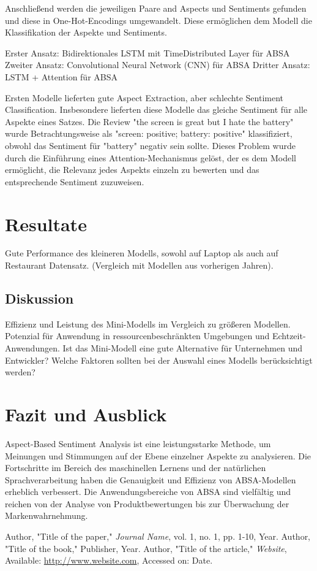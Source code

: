 \documentclass[12pt]{article}
\begin{document}
Anschließend werden die jeweiligen Paare and Aspects und Sentiments gefunden und diese in One-Hot-Encodings umgewandelt. Diese ermöglichen dem Modell die Klassifikation der Aspekte und Sentiments.


Erster Ansatz: Bidirektionales LSTM mit TimeDistributed Layer für ABSA
Zweiter Ansatz: Convolutional Neural Network (CNN) für ABSA
Dritter Ansatz: LSTM + Attention für ABSA

Ersten Modelle lieferten gute Aspect Extraction, aber schlechte Sentiment Classification. Insbesondere lieferten diese Modelle das gleiche Sentiment 
für alle Aspekte eines Satzes. Die Review "the screen is great but I hate the battery" wurde Betrachtungsweise als "screen: positive; battery: positive" 
klassifiziert, obwohl das Sentiment für "battery" negativ sein sollte. Dieses Problem wurde durch die Einführung eines Attention-Mechanismus gelöst, 
der es dem Modell ermöglicht, die Relevanz jedes Aspekts einzeln zu bewerten und das entsprechende Sentiment zuzuweisen.

\section{Resultate}
Gute Performance des kleineren Modells, sowohl auf Laptop als auch auf Restaurant Datensatz. (Vergleich mit Modellen aus vorherigen Jahren).
\subsection{Diskussion}
Effizienz und Leistung des Mini-Modells im Vergleich zu größeren Modellen. Potenzial für Anwendung in ressourcenbeschränkten Umgebungen und Echtzeit-Anwendungen.
Ist das Mini-Modell eine gute Alternative für Unternehmen und Entwickler? Welche Faktoren sollten bei der Auswahl eines Modells berücksichtigt werden?

\section{Fazit und Ausblick}
Aspect-Based Sentiment Analysis ist eine leistungsstarke Methode, um Meinungen und Stimmungen auf der Ebene einzelner Aspekte zu analysieren.
Die Fortschritte im Bereich des maschinellen Lernens und der natürlichen Sprachverarbeitung haben die Genauigkeit und Effizienz von ABSA-Modellen 
erheblich verbessert. Die Anwendungsbereiche von ABSA sind vielfältig und reichen von der Analyse von Produktbewertungen bis zur Überwachung der 
Markenwahrnehmung.
\begin{thebibliography}{9}
 Author, "Title of the paper," \textit{Journal Name}, vol. 1, no. 1, pp. 1-10, Year.
 Author, "Title of the book," Publisher, Year.
 Author, "Title of the article," \textit{Website}, Available: \url{http://www.website.com}, Accessed on: Date.
\end{thebibliography}
\end{document}
